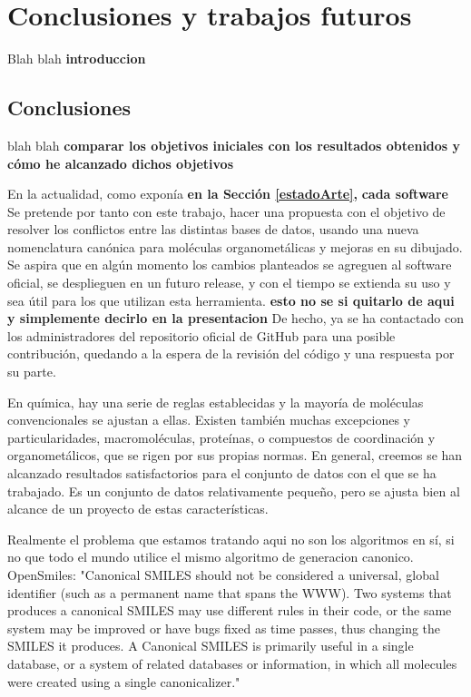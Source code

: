 \chapter{Conclusiones y trabajos futuros} \label{cap:conclusiones}

Blah blah \textbf{introduccion}

\section{Conclusiones}

blah blah \textbf{comparar los objetivos iniciales con los resultados obtenidos y cómo he alcanzado dichos objetivos}

En la actualidad, como exponía \textbf{en la Sección \ref{estadoArte}, } \textbf{cada software }
Se pretende por tanto con este trabajo, hacer una propuesta con el objetivo de resolver los conflictos entre las distintas bases de datos, usando una nueva nomenclatura canónica para moléculas organometálicas y mejoras en su dibujado.
Se aspira que en algún momento los cambios planteados se agreguen al software oficial, se desplieguen en un futuro release, y con el tiempo se extienda su uso y sea útil para los que utilizan esta herramienta. \textbf{esto no se si quitarlo de aqui y simplemente decirlo en la presentacion} De hecho, ya se ha contactado con los administradores del repositorio oficial de GitHub para una posible contribución, quedando a la espera de la revisión del código y una respuesta por su parte.

En química, hay una serie de reglas establecidas y la mayoría de moléculas convencionales se ajustan a ellas. Existen también muchas excepciones y particularidades, macromoléculas, proteínas, o compuestos de coordinación y organometálicos, que se rigen por sus propias normas. En general, creemos se han alcanzado resultados satisfactorios para el conjunto de datos con el que se ha trabajado. Es un conjunto de datos relativamente pequeño, pero se ajusta bien al alcance de un proyecto de estas características. 

Realmente el problema que estamos tratando aqui no son los algoritmos en sí, si no que todo el mundo utilice el mismo algoritmo de generacion canonico. OpenSmiles: "Canonical SMILES should not be considered a universal, global identifier (such as a permanent name that spans the WWW). Two systems that produces a canonical SMILES may use different rules in their code, or the same system may be improved or have bugs fixed as time passes, thus changing the SMILES it produces. A Canonical SMILES is primarily useful in a single database, or a system of related databases or information, in which all molecules were created using a single canonicalizer."

